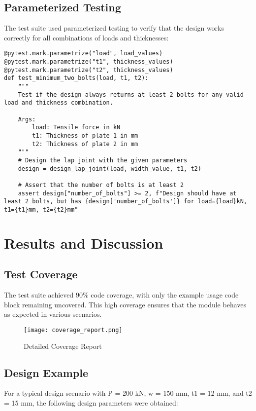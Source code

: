 \documentclass[12pt,a4paper]{article}
\begin{document}
\subsection{Parameterized Testing}
The test suite used parameterized testing to verify that the design works correctly for all combinations of loads and thicknesses:

\begin{lstlisting}
@pytest.mark.parametrize("load", load_values)
@pytest.mark.parametrize("t1", thickness_values)
@pytest.mark.parametrize("t2", thickness_values)
def test_minimum_two_bolts(load, t1, t2):
    """
    Test if the design always returns at least 2 bolts for any valid load and thickness combination.
    
    Args:
        load: Tensile force in kN
        t1: Thickness of plate 1 in mm
        t2: Thickness of plate 2 in mm
    """
    # Design the lap joint with the given parameters
    design = design_lap_joint(load, width_value, t1, t2)
    
    # Assert that the number of bolts is at least 2
    assert design["number_of_bolts"] >= 2, f"Design should have at least 2 bolts, but has {design['number_of_bolts']} for load={load}kN, t1={t1}mm, t2={t2}mm"
\end{lstlisting}

\section{Results and Discussion}
\subsection{Test Coverage}
The test suite achieved 90\% code coverage, with only the example usage code block remaining uncovered. This high coverage ensures that the module behaves as expected in various scenarios.

\begin{figure}[H]
\centering
\texttt{[image: coverage\_report.png]}
\caption{Detailed Coverage Report}
\label{fig:coverage}
\end{figure}

\subsection{Design Example}
For a typical design scenario with P = 200 kN, w = 150 mm, t1 = 12 mm, and t2 = 15 mm, the following design parameters were obtained:
\end{document}
